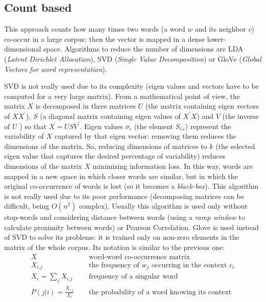 \documentclass[11pt, a4page]{article}
\begin{document}
\subsection{Count based}
This approach counts how many times two words (a word $w$ and its neighbor $c$) co-occur in a large corpus; then the vector is mapped in a dense lower-dimensional space.
Algorithms to reduce the number of dimensions are LDA (\textit{Latent Dirichlet Allocation}), SVD (\textit{Single Value Decomposition}) or GloVe (\textit{Global Vectors for word representation}).

SVD is not really used due to its complexity (eigen values and vectors have to be computed for a very large matrix).
From a mathematical point of view, the matrix $X$ is decomposed in three matrices $U$ (the matrix containing eigen vectors of $X X^\prime$), $S$ (a diagonal matrix containing eigen values of $X^\prime X$) and $V$ (the inverse of $U$ %
) so that $X = U S V^\prime$.
Eigen values $\sigma_i$ (the element $S_{i.i}$) represent the variability of $X$ captured by that eigen vector: removing them reduces the dimensions of the matrix.
So, reducing dimensions of matrices to $k$ (the selected eigen value that captures the desired percentage of variability) reduces dimensions of the matrix $X$ minimizing information loss.
In this way, words are mapped in a new space in which closer words are similar, but in which the original co-occurrence of words is lost (so it becomes a \textit{black-box}).
This algorithm is not really used due to its poor performance (decomposing matrices can be difficult, being $O(n^2)$ complex).
Usually this algorithm is used only without stop-words and considering distance between words (using a \textit{ramp window} to calculate proximity between words) or Pearson Correlation.
Glove is used instead of SVD to solve its problems: it is trained only on non-zero elements in the matrix of the whole corpus.
Its notation is similar to the previous one:
\begin{align*}
  X \hspace{15pt} & \text{word-word co-occurrence matrix} \\
  X_{i.j} \hspace{15pt} & \text{the frequency of $w_j$ occurring in the context $c_i$} \\
  X_i = \sum_j X_{i.j} \hspace{15pt} & \text{frequency of a singular word} \\
  P(j|i) = \frac{X_{i.j}}{X_i} \hspace{15pt} & \text{the probability of a word knowing its context}
\end{align*}
\end{document}
